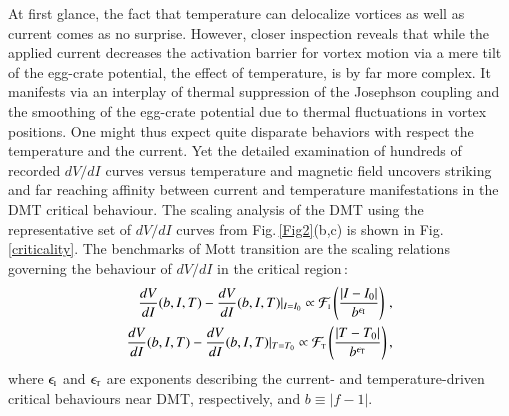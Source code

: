 \documentclass[aps,twocolumn,prl,10pt,amsmath,amssymb,nofootinbib,showpacs,superscriptaddress,floatfix]{revtex4-1}
\newcommand{\rs}{\rm\scriptscriptstyle}
\begin{document}
At first glance, the fact that temperature can delocalize vortices as well as current comes as no surprise.  However, closer inspection reveals that while the applied current decreases the activation barrier for vortex motion via a mere tilt of the egg-crate potential, the effect of temperature, is by far more complex. It manifests via an interplay of thermal suppression of the Josephson coupling and the smoothing of the egg-crate potential due to thermal fluctuations in vortex positions. One might thus expect quite disparate behaviors with respect the temperature and the current. Yet the detailed examination of hundreds of recorded $dV/dI$ curves versus temperature and magnetic field uncovers striking and far reaching affinity between current and temperature manifestations in the DMT critical behaviour.
The scaling analysis of the 
DMT using the representative set of $dV/dI$ curves from Fig.\,\ref{Fig2}(b,c) is shown in Fig.\,\ref{criticality}.
The benchmarks of Mott transition are the scaling relations governing the 
behaviour of $dV/dI$ in the critical region\,\cite{Imada:1998,Balents:2005,Sachdev:book,Quantum:2012,Science2015}:
\begin{eqnarray}
	\label{scalingdynamic}
	\frac{dV}{dI}(b,I,T) - \frac{dV}{dI}(b,I,T)|_{I=I_0} \propto{\cal F_{\rs I}}\left(\frac{|I - I_0|}{b^{\epsilon_{\rs I}}}\right)\,,\\
	\label{scalingthermal} 
	\frac{dV}{dI}(b,I,T) - \frac{dV}{dI}(b,I,T)|_{T=T_0} \propto{\cal F_{\rs T}}\left(\frac{|T - T_0|}{b^{\epsilon_{\rs T}}}\right),
\end{eqnarray}
%
where $\epsilon_{\rs I}$ and $\epsilon_{\rs T}$ are exponents describing the current- and temperature-driven critical behaviours near DMT, respectively, and  $b\equiv |f-1|$.
\end{document}
